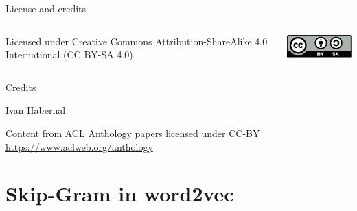 \documentclass[12pt,aspectratio=169,handout]{beamer}
\begin{document}
\begin{frame}{License and credits}

	\begin{columns}
		\begin{column}{0.7\textwidth}
			Licensed under Creative Commons Attribution-ShareAlike 4.0 International (CC BY-SA 4.0)
		\end{column}
		\begin{column}{0.2\textwidth}
			\includegraphics[width=0.9\linewidth]{img/cc-by-sa-icon.pdf}
		\end{column}
	\end{columns}
	
	\bigskip
	
	Credits
	
	\begin{scriptsize}
		
		Ivan Habernal
		
		Content from ACL Anthology papers licensed under CC-BY \url{https://www.aclweb.org/anthology}
		
	
	\end{scriptsize}
	
\end{frame}


\appendix

\section*{Skip-Gram in word2vec}
\end{document}
